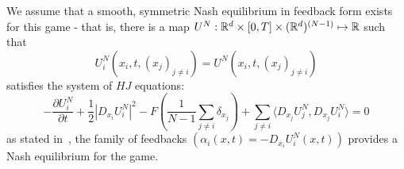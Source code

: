 We assume that a smooth, symmetric Nash equilibrium in feedback form exists for
this game - that is, there is a map
$U^N : \mathbb{R}^d \times [0,T] \times (\mathbb{R}^d)^{(N-1)} \mapsto \mathbb{R}$ such that
\begin{equation}
    U^N_i(x_i, t, (x_j)_{j\neq i}) = U^N(x_i, t, (x_j)_{j\neq i})
\end{equation}
satisfies the system of $HJ$ equations:
\begin{equation}
    -\frac{\partial U_i^N}{\partial t} + \frac{1}{2}|D_{x_i} U_i^N|^2 - F\left( \frac{1}{N-1}  \sum_{j\neq i} \delta_{x_j} \right) + \sum_{j \neq i} \langle D_{x_j} U^N_j, D_{x_j} U^N_i \rangle = 0
\end{equation}
as stated in~\cite{cardaliaguet2010notes}, the family of feedbacks $(\alpha_i(x,t) = - D_{x_i} U^N_i (x,t))$
provides a Nash equilibrium for the game.

